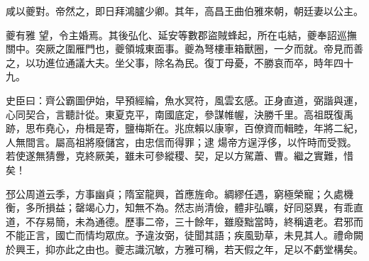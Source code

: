 \begin{pinyinscope}
 咸以夔對。帝然之，即日拜鴻臚少卿。其年，高昌王曲伯雅來朝，朝廷妻以公主。



 夔有雅
 望，令主婚焉。其後弘化、延安等數郡盜賊蜂起，所在屯結，夔奉詔巡撫關中。突厥之圍雁門也，夔領城東面事。夔為弩樓車箱獸圈，一夕而就。帝見而善之，以功進位通議大夫。坐父事，除名為民。復丁母憂，不勝哀而卒，時年四十九。



 史臣曰：齊公霸圖伊始，早預經綸，魚水冥符，風雲玄感。正身直道，弼諧與運，心同契合，言聽計從。東夏克平，南國底定，參謀帷幄，決勝千里。高祖既復禹跡，思布堯心，舟楫是寄，鹽梅斯在。兆庶賴以康寧，百僚資而輯睦，年將二紀，人無間言。屬高祖將廢儲宮，由忠信而得罪；逮
 煬帝方逞浮侈，以忤時而受戮。若使遂無猜釁，克終厥美，雖未可參縱稷、契，足以方駕蕭、曹。繼之實難，惜矣！



 邳公周道云季，方事幽貞；隋室龍興，首應旌命。綢繆任遇，窮極榮寵；久處機衡，多所損益；罄竭心力，知無不為。然志尚清儉，體非弘曠，好同惡異，有乖直道，不存易簡，未為通德。歷事二帝，三十餘年，雖廢黜當時，終稱遺老。君邪而不能正言，國亡而情均眾庶。予違汝弼，徒聞其語；疾風勁草，未見其人。禮命闕於興王，抑亦此之由也。夔志識沉敏，方雅可稱，若天假之年，足以不虧堂構矣。



\end{pinyinscope}